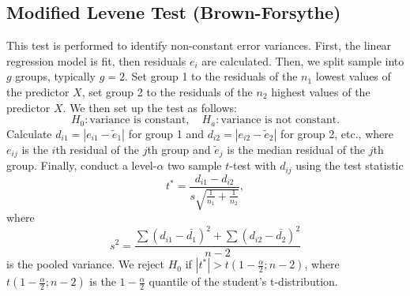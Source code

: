 \documentclass{mcmthesis}
\begin{document}
\begin{appendices}

\section{Modified Levene Test (Brown-Forsythe)}\label{ap:mlt}

This test is performed to identify non-constant error variances. First, the linear regression model is fit, then residuals $e_i$ are calculated. Then, we split sample into $g$ groups, typically $g = 2$. Set group 1 to the residuals of the $n_1$ lowest values of the predictor $X$, set group 2 to the residuals of the $n_2$ highest values of the predictor $X$. We then set up the test as follows:
\[
	H_0 : \text{variance is constant}, \quad H_a : \text{variance is not constant}.
\]
Calculate $d_{i1} = |e_{i1} - \tilde{e}_{1}|$ for group 1 and $d_{i2} = |e_{i2} - \tilde{e}_{2}|$ for group 2, etc., where $e_{ij}$ is the $i$th residual of the $j$th group and $\tilde{e}_j$ is the median residual of the $j$th group. Finally, conduct a level-$\alpha$ two sample $t$-test with $d_{ij}$ using the test statistic
\[
t^* = \frac{d_{i1} - d_{i2}}{s\sqrt{\frac{1}{n_1} + \frac{1}{n_2}}},
\]
where
\[
s^2 = \frac{\sum (d_{i1} - \bar{d_1})^2 + \sum (d_{i2} - \bar{d_2})^2}{n-2}
\]
is the pooled variance. We reject $H_0$ if $|t^*| > t\left( 1-\frac{\alpha}{2} ; n - 2 \right)$, where $t\left( 1-\frac{\alpha}{2} ; n - 2 \right)$ is the $1-\frac{\alpha}{2}$ quantile of the student's t-distribution.

\end{appendices}



\end{document}
